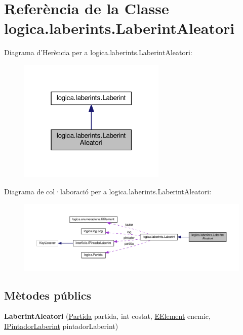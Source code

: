 \hypertarget{classlogica_1_1laberints_1_1_laberint_aleatori}{\section{Referència de la Classe logica.\+laberints.\+Laberint\+Aleatori}
\label{classlogica_1_1laberints_1_1_laberint_aleatori}
}


Diagrama d'Herència per a logica.\+laberints.\+Laberint\+Aleatori\+:\nopagebreak
\begin{figure}[H]
\begin{center}
\leavevmode
\includegraphics[width=199pt]{classlogica_1_1laberints_1_1_laberint_aleatori__inherit__graph}
\end{center}
\end{figure}


Diagrama de col·laboració per a logica.\+laberints.\+Laberint\+Aleatori\+:\nopagebreak
\begin{figure}[H]
\begin{center}
\leavevmode
\includegraphics[width=350pt]{classlogica_1_1laberints_1_1_laberint_aleatori__coll__graph}
\end{center}
\end{figure}
\subsection*{Mètodes públics}
\begin{DoxyCompactItemize}
\item 
\hypertarget{classlogica_1_1laberints_1_1_laberint_aleatori_aafae50e4b6d51475d8e53d7fee61785b}{{\bfseries Laberint\+Aleatori} (\hyperlink{classlogica_1_1_partida}{Partida} partida, int costat, \hyperlink{enumlogica_1_1enumeracions_1_1_e_element}{E\+Element} enemic, \hyperlink{interfaceinterficie_1_1_i_pintador_laberint}{I\+Pintador\+Laberint} pintador\+Laberint)}\label{classlogica_1_1laberints_1_1_laberint_aleatori_aafae50e4b6d51475d8e53d7fee61785b}

\end{DoxyCompactItemize}
